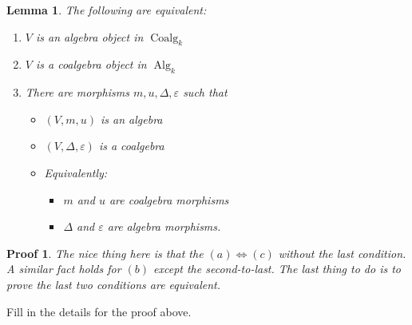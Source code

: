 \documentclass[12pt]{article}
\theoremstyle{break}
\theoremstyle{nonumberbreak}
\theoremstyle{changebreak}
\newtheorem{lem}[thm]{Lemma}
\theoremstyle{break}
\theoremstyle{nonumberbreak}
\newtheorem{prf}{Proof}
\theoremstyle{nonumberplain}
\theoremstyle{change}
\newcommand*{\Algk}{\operatorname{Alg}_k}
\newcommand*{\Coalgk}{\operatorname{Coalg}_k}
\begin{document}
\begin{lem}
	The following are equivalent:
	\begin{enumerate}
		\item $V$ is an algebra object in $\Coalgk$
		\item $V$ is a coalgebra object in $\Algk$
		\item There are morphisms $m,u,\Delta,\varepsilon$ such that
		\begin{itemize}
			\item $(V,m,u)$ is an algebra
			\item $(V,\Delta,\varepsilon)$ is a coalgebra
			\item Equivalently:
			\begin{itemize}
				\item $m$ and $u$ are coalgebra morphisms
				\item $\Delta$ and $\varepsilon$ are algebra morphisms.
			\end{itemize}
		\end{itemize}
	\end{enumerate}
\end{lem}
\begin{prf}
	The nice thing here is that the $(a)\Leftrightarrow (c)$ without the last condition. A similar fact holds
	for $(b)$ except the second-to-last. The last thing to do is to prove the last two conditions are equivalent.
\end{prf}
\begin{prob}
	Fill in the details for the proof above.
\end{prob}
\end{document}
